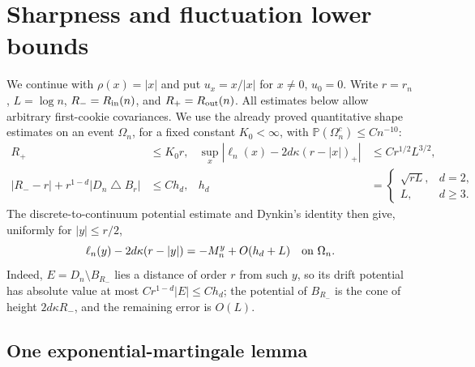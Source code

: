 
\section{Sharpness and fluctuation lower bounds}

We continue with $\rho(x)=|x|$ and put $u_x=x/|x|$ for
$x\ne0$, $u_0=0$.
Write $r=r_n$, $L=\log n$, $R_-=R_{\mathrm{in}}(n)$, and $R_+=R_{\mathrm{out}}(n)$.
All estimates below allow arbitrary first-cookie covariances.
We use the already proved quantitative shape estimates on an event
$\Omega_n$, for a fixed constant $K_0<\infty$, with $\mathbb P(\Omega_n^c)\leq Cn^{-10}$:
\begin{align}
 R_+&\leq K_0r,&
 \sup_x|\ell_n(x)-2d\kappa(r-|x|)_+|
      &\leq Cr^{1/2}L^{3/2},\label{eq:lower-input-profile}\\
 |R_--r|+r^{1-d}|D_n\mathbin\triangle B_r|
      &\leq C h_d,&
 h_d&=\begin{cases}\sqrt{rL},&d=2,\\L,&d\geq3.
                  \end{cases}\label{eq:lower-input-volume}
\end{align}
The discrete-to-continuum potential estimate and Dynkin's identity
then give, uniformly for $|y|\leq r/2$,
\begin{equation}\label{eq:lower-bulk-representation}
 \ell_n(y)-2d\kappa(r-|y|)=-M_n^y+O(h_d+L)
 \quad\hbox{on }\Omega_n.
\end{equation}
Indeed, $E=D_n\setminus B_{R_-}$ lies a distance of order $r$
from such $y$, so its drift potential has absolute value at most
$Cr^{1-d}|E|\leq Ch_d$; the potential of $B_{R_-}$ is the cone
of height $2d\kappa R_-$, and the remaining error is $O(L)$.
\subsection{One exponential-martingale lemma}

